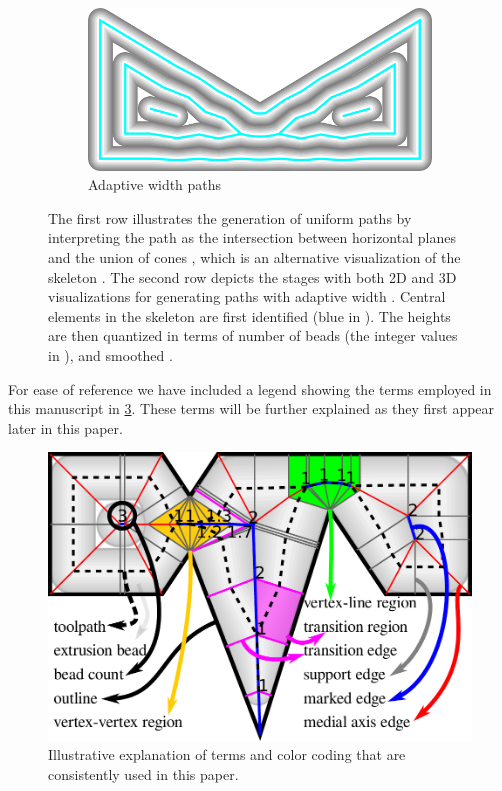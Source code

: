 \begin{figure}
\begin{subfigure}{\figwidth}
\includegraphics[width=\figheight]{sources/method/overview/2D/sliced.png}
\caption{Adaptive width paths}\label{3d_surface_overview_sliced}
\end{subfigure}
\caption{
The first row illustrates the generation of uniform paths 
by interpreting the path as the intersection between horizontal planes and the union of cones , which is an alternative visualization of the skeleton . 
The second row depicts the stages with both 2D and 3D visualizations for generating paths with adaptive width .
Central elements in the skeleton are first identified (blue in ).
The heights are then quantized in terms of number of beads (the integer values in ), and smoothed .
}
\label{3d_surface_overview}
\end{figure}

For ease of reference we have included a legend showing the terms employed in this manuscript in \cref{legend}.
These terms will be further explained as they first appear later in this paper. 

\begin{figure}\centering
\includegraphics[width=.75\columnwidth]{sources/method/legend2.pdf}
\caption{Illustrative explanation of terms and color coding that are consistently used in this paper.}
\label{legend}
\end{figure}




















